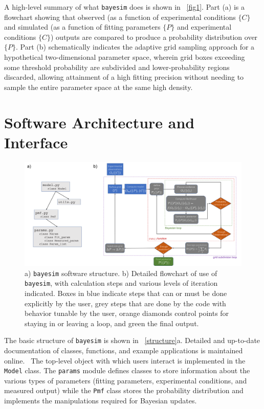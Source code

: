\documentclass[aps,prl,amsmath,amssymb,superscriptaddress,notitlepage,groupedaddress]{revtex4-1}
\begin{document}
 A high-level summary of what \texttt{bayesim} does is shown in ~\autoref{fig1}. Part (a) is a flowchart showing that observed (as a function of experimental conditions $\{C\}$ and simulated (as a function of fitting parameters $\{P\}$ and experimental conditions $\{C\}$) outputs are compared to produce a probability distribution over $\{P\}$. Part (b) schematically indicates the adaptive grid sampling approach for a hypothetical two-dimensional parameter space, wherein grid boxes exceeding some threshold probability are subdivided and lower-probability regions discarded, allowing attainment of a high fitting precision without needing to sample the entire parameter space at the same high density.

\section*{Software Architecture and Interface}

  \begin{figure}
    \includegraphics[width=0.95\columnwidth]{figure_2.png}
    \caption{a) \texttt{bayesim} software structure. b) Detailed flowchart of use of \texttt{bayesim}, with calculation steps and various levels of iteration indicated. Boxes in blue indicate steps that can or must be done explicitly by the user, grey steps that are done by the code with behavior tunable by the user, orange diamonds control points for staying in or leaving a loop, and green the final output.}
    \label{structure}
  \end{figure}

  The basic structure of \texttt{bayesim} is shown in ~\autoref{structure}a. Detailed and up-to-date documentation of classes, functions, and example applications is maintained online.~\cite{docs} The top-level object with which users interact is implemented in the \texttt{Model} class. The \texttt{params} module defines classes to store information about the various types of parameters (fitting parameters, experimental conditions, and measured output) while the \texttt{Pmf} class stores the probability distribution and implements the manipulations required for Bayesian updates.
\end{document}
